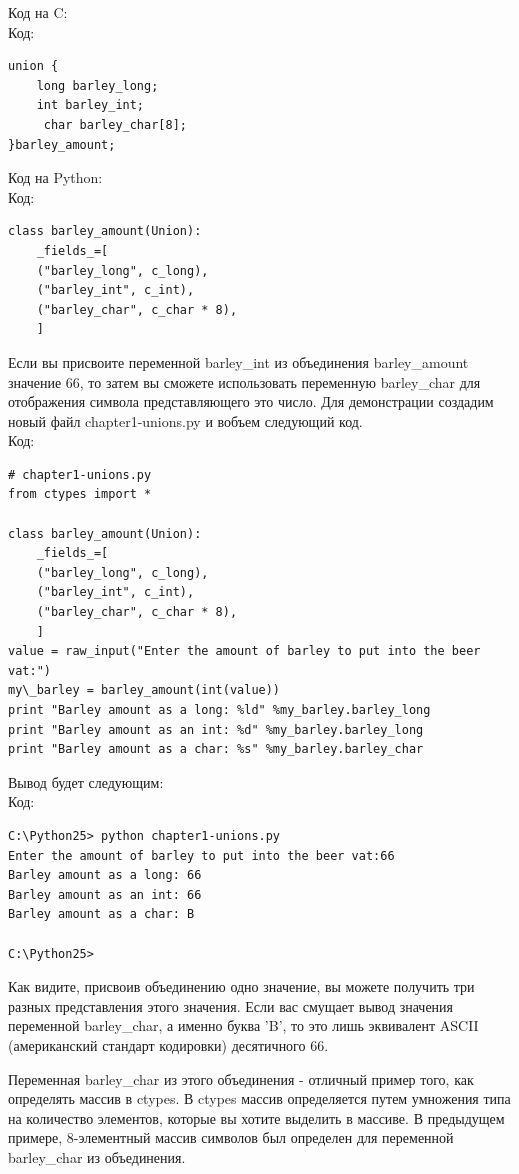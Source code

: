 \documentclass[12pt, a4paper, oneside]{book}
\begin{document}
Код на C:\\
Код:
\begin{verbatim}
union {
    long barley_long;
    int barley_int;
     char barley_char[8];
}barley_amount;
\end{verbatim}
Код на Python:\\
Код:
\begin{verbatim}
class barley_amount(Union):
    _fields_=[
    ("barley_long", c_long),
    ("barley_int", c_int),
    ("barley_char", c_char * 8),
    ]
\end{verbatim}
Если вы присвоите переменной barley\_int из объединения barley\_amount значение 66, то затем вы сможете использовать переменную barley\_char для отображения символа представляющего это число. Для демонстрации создадим новый файл chapter1-unions.py и вобъем следующий код.\\
Код:
\begin{verbatim}
# chapter1-unions.py
from ctypes import *

class barley_amount(Union):
    _fields_=[
    ("barley_long", c_long),
    ("barley_int", c_int),
    ("barley_char", c_char * 8),
    ]
value = raw_input("Enter the amount of barley to put into the beer vat:")
my\_barley = barley_amount(int(value))
print "Barley amount as a long: %ld" %my_barley.barley_long
print "Barley amount as an int: %d" %my_barley.barley_long
print "Barley amount as a char: %s" %my_barley.barley_char
\end{verbatim}
Вывод будет следующим:\\
Код:
\begin{verbatim}
C:\Python25> python chapter1-unions.py
Enter the amount of barley to put into the beer vat:66
Barley amount as a long: 66
Barley amount as an int: 66
Barley amount as a char: B

C:\Python25>
\end{verbatim}
Как видите, присвоив объединению одно значение, вы можете получить три разных представления этого значения. Если вас смущает вывод значения переменной barley_char, а именно буква 'B', то это лишь эквивалент ASCII (американский стандарт кодировки) десятичного 66.

Переменная barley\_char из этого объединения - отличный пример того, как определять массив в ctypes. В ctypes массив определяется путем умножения типа на количество элементов, которые вы хотите выделить в массиве. В предыдущем примере, 8-элементный массив символов был определен для переменной barley\_char из объединения.\\
\end{document}
